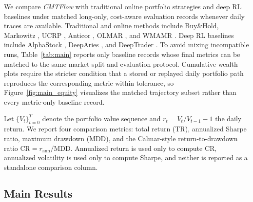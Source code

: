 \documentclass[letterpaper]{article} %
\begin{document}
We compare \textit{CMTFlow} with traditional online portfolio strategies and deep RL baselines under matched long-only, cost-aware evaluation records whenever daily traces are available. Traditional and online methods include Buy\&Hold, Markowitz \citep{MVO}, UCRP \citep{UCRP}, Anticor \citep{ANTICOR}, OLMAR \citep{OLMAR}, and WMAMR \citep{WMAMR}. Deep RL baselines include AlphaStock \citep{alphastock}, DeepAries \citep{deeparies2025}, and DeepTrader \citep{6}. To avoid mixing incompatible runs, Table~\ref{tab:main} reports only baseline records whose final metrics can be matched to the same market split and evaluation protocol. Cumulative-wealth plots require the stricter condition that a stored or replayed daily portfolio path reproduces the corresponding metric within tolerance, so Figure~\ref{fig:main_equity} visualizes the matched trajectory subset rather than every metric-only baseline record.

Let \(\{V_t\}_{t=0}^{T}\) denote the portfolio value sequence and \(r_t=V_t/V_{t-1}-1\) the daily return. We report four comparison metrics: total return (TR), annualized Sharpe ratio, maximum drawdown (MDD), and the Calmar-style return-to-drawdown ratio \(\mathrm{CR}=r_{\mathrm{ann}}/\mathrm{MDD}\). Annualized return is used only to compute CR, annualized volatility is used only to compute Sharpe, and neither is reported as a standalone comparison column.

\subsection{Main Results}
\end{document}

